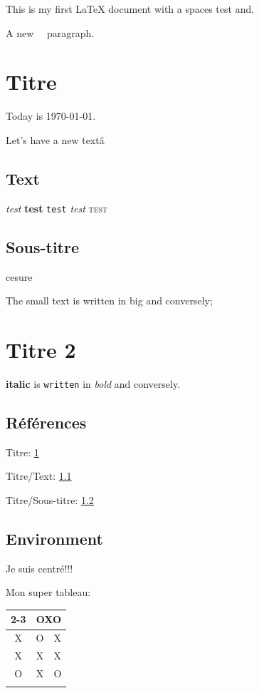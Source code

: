 \documentclass{article}
\begin{document}
This is my first \LaTeX{} document with a spaces test and.

A new \ \ paragraph.

\tableofcontents
\listoffigures
\listoftables

\section{Titre}\label{section:titre}

Today is \today.

Let's  have a new textâ

\subsection{Text}\label{subsection:text}

\emph{test}
\textbf{test}
\texttt{test}
\textit{test}
\textsc{test}

\subsection{Sous-titre}\label{subsection:soustitre}
ce\-su\-re

The {\Large small} text is written in {\tiny big} and conversely;

\section{Titre 2}

\textbf{italic} is \texttt{written} in \textit{bold} and conversely.

\subsection{Références}

Titre: \ref{section:titre} \pageref{section:titre}

Titre/Text: \ref{subsection:text} \pageref{subsection:text}

Titre/Sous-titre: \ref{subsection:soustitre} \pageref{subsection:soustitre}

\subsection{Environment}

\begin{center}
Je suis centré!!!

Mon super tableau:
\begin{tabular}{|c|c|c|}
	\cline{2-3}
	\multicolumn{1}{c}{} & \multicolumn{2}{|c|}{OXO}\\
	\hline
	X & O & X\\
	\hline
	X & X & X\\
	\hline
	O & X & O\\
	\hline

	\label{table}
\end{tabular}
\end{center}
\end{document}
